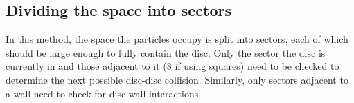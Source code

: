 \documentclass{article}
\begin{document}
\subsection{Dividing the space into sectors}
In this method, the space the particles occupy is split into sectors, each of which should be large enough to fully contain the disc. Only the sector the disc is currently in and those adjacent to it (8 if using squares) need to be checked to determine the next possible disc-disc collision. Similarly, only sectors adjacent to a wall need to check for disc-wall interactions.



\end{document}
